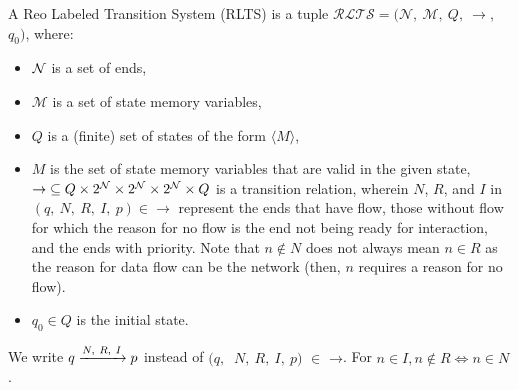 \begin{definition}[RLTS]
\label{def:rlts}
A Reo Labeled Transition System (RLTS) is a tuple $\mathcal{RLTS}$$=$$($$\mathcal{N},\ \mathcal{M},\ 
$$Q,\ $$\rightarrow,\ $$q_0)$, where: 
\begin{itemize}
 \item $\mathcal{N}$ is a set of ends, 
 \item $\mathcal{M}$ is a set of state memory variables, 
 \item $Q$ is a (finite) set of states of the form $\langle M %
\rangle$, 
\item $M$ is the set of state memory variables that are valid in the given state, %
 $\mathord{\rightarrow} \subseteq Q \times 2^{\mathcal{N}} \times 2^{\mathcal{N}} \times 2^{\mathcal{N}} \times Q$ is a transition relation, wherein $N$, $R$, and $I$ in $(q,\ N,\ R,\ I,\ p) \in \rightarrow$ represent the ends that have flow, those without flow for which the reason for no flow is the end not being ready for interaction, and the ends with priority. Note that $n \not \in N$ does not always mean $n \in R$ as the reason for data flow can be the network (then, $n$ requires a reason for no flow).  %
 \item $q_0 \in Q$ is the initial state.
\end{itemize}

 We write $\longtransition{q}{N,\ R,\ I}{p}$ instead of 
 $(q,\ $ $N,\ $$R,\ $$I,\ $$p)$ $\in$ $\mathord{\rightarrow}$. For 
$n \in I, n \notin R \Leftrightarrow n \in N$. 
\end{definition}


